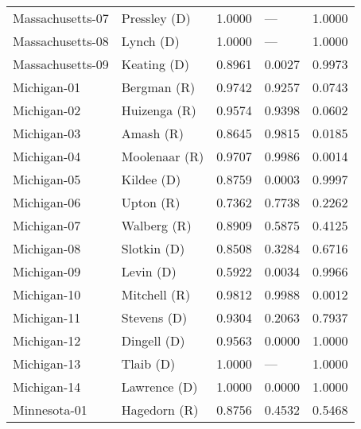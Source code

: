\begin{longtable}{llrll}
  Massachusetts-07 &         {\color{Blue} Pressley (D)} &       1.0000 &           --- &        1.0000 \\
  Massachusetts-08 &            {\color{Blue} Lynch (D)} &       1.0000 &           --- &        1.0000 \\
  Massachusetts-09 &          {\color{Blue} Keating (D)} &       0.8961 &        0.0027 &        0.9973 \\
       Michigan-01 &           {\color{Red} Bergman (R)} &       0.9742 &        0.9257 &        0.0743 \\
       Michigan-02 &          {\color{Red} Huizenga (R)} &       0.9574 &        0.9398 &        0.0602 \\
       Michigan-03 &             {\color{Red} Amash (R)} &       0.8645 &        0.9815 &        0.0185 \\
       Michigan-04 &         {\color{Red} Moolenaar (R)} &       0.9707 &        0.9986 &        0.0014 \\
       Michigan-05 &           {\color{Blue} Kildee (D)} &       0.8759 &        0.0003 &        0.9997 \\
       Michigan-06 &             {\color{Red} Upton (R)} &       0.7362 &        0.7738 &        0.2262 \\
       Michigan-07 &           {\color{Red} Walberg (R)} &       0.8909 &        0.5875 &        0.4125 \\
       Michigan-08 &          {\color{Blue} Slotkin (D)} &       0.8508 &        0.3284 &        0.6716 \\
       Michigan-09 &            {\color{Blue} Levin (D)} &       0.5922 &        0.0034 &        0.9966 \\
       Michigan-10 &          {\color{Red} Mitchell (R)} &       0.9812 &        0.9988 &        0.0012 \\
       Michigan-11 &          {\color{Blue} Stevens (D)} &       0.9304 &        0.2063 &        0.7937 \\
       Michigan-12 &          {\color{Blue} Dingell (D)} &       0.9563 &        0.0000 &        1.0000 \\
       Michigan-13 &            {\color{Blue} Tlaib (D)} &       1.0000 &           --- &        1.0000 \\
       Michigan-14 &         {\color{Blue} Lawrence (D)} &       1.0000 &        0.0000 &        1.0000 \\
      Minnesota-01 &          {\color{Red} Hagedorn (R)} &       0.8756 &        0.4532 &        0.5468 \\

\end{longtable}
